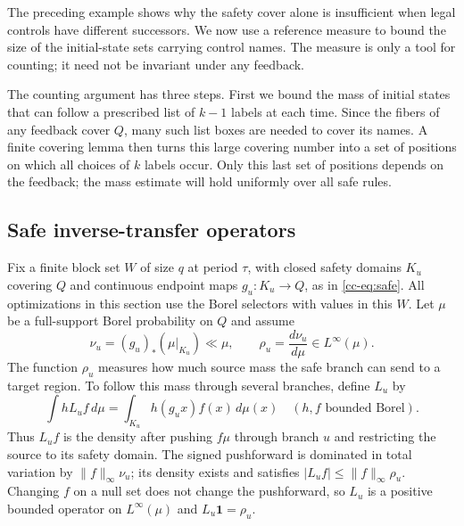 \documentclass[11pt,reqno]{amsart}
\numberwithin{equation}{section}
\theoremstyle{definition}
\theoremstyle{definition}
\newcommand{\one}{\mathbf 1}
\begin{document}
The preceding example shows why the safety cover alone is insufficient
when legal controls have different successors. We now use a reference
measure to bound the size of the initial-state sets carrying control
names. The measure is only a tool for counting; it need not be
invariant under any feedback.

The counting argument has three steps. First we bound the mass of
initial states that can follow a prescribed list of $k-1$ labels at
each time. Since the fibers of any feedback cover $Q$, many such list
boxes are needed to cover its names. A finite covering lemma then turns
this large covering number into a set of positions on which all choices
of $k$ labels occur. Only this last set of positions depends on the
feedback; the mass estimate will hold uniformly over all safe rules.

\subsection{Safe inverse-transfer operators}
Fix a finite block set $W$ of size $q$ at period $\tau$, with
closed safety domains $K_u$ covering $Q$ and continuous endpoint
maps $g_u:K_u\to Q$, as in \eqref{cc-eq:safe}. All optimizations
in this section use the Borel selectors with values in this $W$.
Let $\mu$ be a full-support Borel probability on $Q$ and assume
\begin{equation}\label{eq:cap-density}
 \nu_u=(g_u)_*(\mu|_{K_u})\ll\mu,\qquad
 \rho_u=\frac{d\nu_u}{d\mu}\in L^\infty(\mu).
\end{equation}
The function $\rho_u$ measures how much source mass the safe branch
can send to a target region. To follow this mass through several
branches, define $L_u$ by
\begin{equation}\label{eq:cap-transfer}
 \int hL_uf\,d\mu=\int_{K_u}h(g_ux)f(x)\,d\mu(x)
 \quad(h,f\text{ bounded Borel}).
\end{equation}
Thus $L_uf$ is the density after pushing $f\mu$ through branch $u$
and restricting the source to its safety domain. The signed
pushforward is dominated in total variation by $\|f\|_\infty\nu_u$;
its density exists and satisfies
$|L_uf|\le\|f\|_\infty\rho_u$. Changing $f$ on a null set
does not change the pushforward, so $L_u$ is a positive bounded
operator on $L^\infty(\mu)$ and $L_u\one=\rho_u$.
\end{document}
